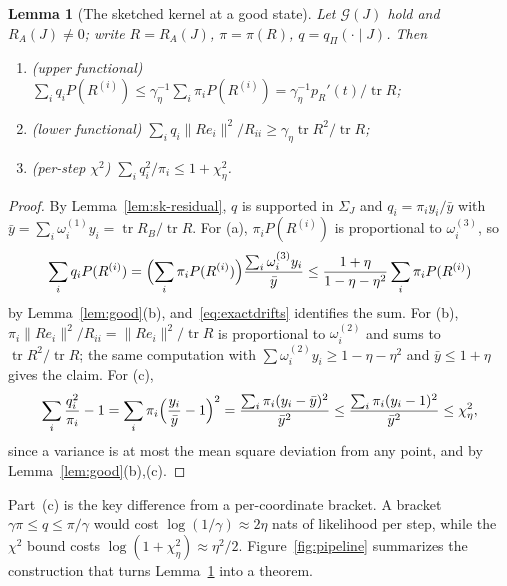 \documentclass[11pt]{article}
\newtheorem{lemma}[theorem]{Lemma}
\theoremstyle{definition}\newtheorem{definition}[theorem]{Definition}
\theoremstyle{remark}\newtheorem{remark}[theorem]{Remark}
\newcommand{\tr}{\operatorname{tr}}
\newcommand{\calG}{\mathcal G}
\newcommand{\1}{\mathbf 1}
\begin{document}
\begin{lemma}[The sketched kernel at a good state]\label{lem:kernel}
Let $\calG(J)$ hold and $R_A(J)\ne0$; write $R=R_A(J)$, $\pi=\pi(R)$,
$q=q_\Pi(\cdot\mid J)$. Then
\begin{enumerate}[label=\textup{(\alph*)}]
\item \textup{(upper functional)}
 $\sum_iq_iP(R^{(i)})\le\gamma_\eta^{-1}\sum_i\pi_iP(R^{(i)})
 =\gamma_\eta^{-1}p_R'(t)/\tr R$;
\item \textup{(lower functional)}
 $\sum_iq_i\|Re_i\|^2/R_{ii}\ge\gamma_\eta\tr R^2/\tr R$;
\item \textup{(per-step $\chi^2$)}
 $\sum_iq_i^2/\pi_i\le1+\chi^2_\eta$.
\end{enumerate}
\end{lemma}
\begin{proof}
By Lemma~\ref{lem:sk-residual}, $q$ is supported in $\Sigma_J$ and
$q_i=\pi_iy_i/\bar y$ with $\bar y=\sum_i\omega^{(1)}_iy_i=\tr R_B/\tr R$.
For (a), $\pi_iP(R^{(i)})$ is proportional to $\omega^{(3)}_i$, so
\[
 \sum_iq_iP(R^{(i)})=\Bigl(\sum_i\pi_iP(R^{(i)})\Bigr)
 \frac{\sum_i\omega^{(3)}_iy_i}{\bar y}
 \le\frac{1+\eta}{1-\eta-\eta^2}\sum_i\pi_iP(R^{(i)})
\]
by Lemma~\ref{lem:good}(b), and~\eqref{eq:exactdrifts} identifies the
sum. For (b), $\pi_i\|Re_i\|^2/R_{ii}=\|Re_i\|^2/\tr R$ is proportional
to $\omega^{(2)}_i$ and sums to $\tr R^2/\tr R$; the same computation
with $\sum\omega^{(2)}_iy_i\ge1-\eta-\eta^2$ and $\bar y\le1+\eta$ gives
the claim. For (c),
\[
 \sum_i\frac{q_i^2}{\pi_i}-1=\sum_i\pi_i\Bigl(\frac{y_i}{\bar y}-1\Bigr)^2
 =\frac{\sum_i\pi_i(y_i-\bar y)^2}{\bar y^2}
 \le\frac{\sum_i\pi_i(y_i-1)^2}{\bar y^2}\le\chi^2_\eta,
\]
since a variance is at most the mean square deviation from any point,
and by Lemma~\ref{lem:good}(b),(c).
\end{proof}

Part~(c) is the key difference from a per-coordinate bracket. A bracket
$\gamma\pi\le q\le\pi/\gamma$ would cost $\log(1/\gamma)\approx2\eta$
nats of likelihood per step, while the $\chi^2$ bound costs
$\log(1+\chi^2_\eta)\approx\eta^2/2$. Figure~\ref{fig:pipeline}
summarizes the construction that turns Lemma~\ref{lem:kernel} into a
theorem.
\end{document}
